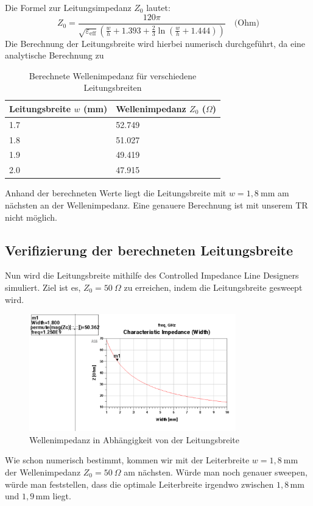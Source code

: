 Die Formel zur Leitungsimpedanz $Z_0$ lautet:
\begin{equation}
Z_0 = \frac{120 \pi}{\sqrt{\varepsilon_{\text{eff}}} \left( \frac{w}{h} + 1.393 + \frac{2}{3} \ln\left( \frac{w}{h} + 1.444 \right) \right)} \quad \text{(Ohm)}
\end{equation}
Die Berechnung der Leitungsbreite wird hierbei numerisch durchgeführt, da eine analytische Berechnung zu
    
    \begin{table}[H]
        \centering
        \begin{tabular}{|l|l|}
            \hline
            \textbf{Leitungsbreite $w$ (mm)} & \textbf{Wellenimpedanz $Z_0$ ($\Omega$)} \\
            \hline
            1.7 & 52.749 \\
            1.8 & 51.027 \\
            1.9 & 49.419 \\
            2.0 & 47.915 \\
           
            \hline
        \end{tabular}
        \caption{Berechnete Wellenimpedanz für verschiedene Leitungsbreiten}
    \end{table}
    Anhand der berechneten Werte liegt die Leitungsbreite mit $w = 1{,}8~\mathrm{mm}$ am nächsten an der Wellenimpedanz.
    Eine genauere Berechnung ist mit unserem TR nicht möglich. 

       

    \subsection{Verifizierung der berechneten Leitungsbreite}
    Nun wird die Leitungsbreite mithilfe des Controlled Impedance Line Designers simuliert.
    Ziel ist es, $Z_0 = 50~\Omega$ zu erreichen, indem die Leitungsbreite gesweept wird.
    \begin{figure}[H]
        \centering
        \includegraphics[width=0.8\textwidth]{Pictures/LeitungsbreitenSweep.png}
        \caption{Wellenimpedanz in Abhängigkeit von der Leitungsbreite}
    \end{figure}
    Wie schon numerisch bestimmt, kommen wir mit der Leiterbreite $w=1{,}8~\mathrm{mm}$ der Wellenimpedanz $Z_0 = 50~\Omega$
    am nächsten. Würde man noch genauer sweepen, würde man feststellen, dass die optimale Leiterbreite irgendwo zwischen
    $1{,}8\,\mathrm{mm}$ und $1{,}9\,\mathrm{mm}$ liegt.

